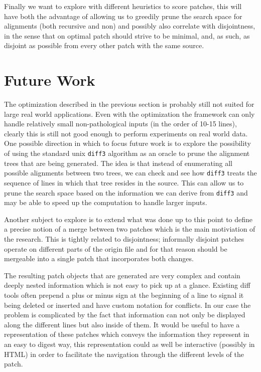 \documentclass[11pt]{article}
\begin{document}
Finally we want to explore with different heuristics to score patches, this will 
have both the advantage of allowing us to greedily prune the search space for 
alignments (both recursive and non) and possibly also correlate with 
disjointness, in the sense that on optimal patch should strive to be minimal, 
and, as such, as disjoint as possible from every other patch with the same source.

\section{Future Work}\label{future work}
The optimization described in the previous section is probably still not suited 
for large real world applications. Even with the optimization the framework can only handle relatively small 
non-pathological inputs (in the order of 10-15 lines), clearly this is still not good enough to perform experiments
on real world data. One possible direction in which to focus future work is to explore the 
possibility of using the standard unix \texttt{diff3} algorithm as an oracle to prune the 
alignment trees that are being generated. 
The idea is that instead of enumerating all possible alignments between two 
trees, we can check and see how \texttt{diff3} treats the sequence of lines in which that 
tree resides in the source. This can allow us to prune the search space based on 
the information we can derive from \texttt{diff3} and may be able to speed up 
the computation to handle larger inputs.

Another subject to explore is to extend what was done up to this point to define 
a precise notion of a merge between two patches which is the main motiviation of the 
research. This is tightly related to disjointness; informally disjoint 
patches operate on different parts of the origin file and for that reason should 
be mergeable into a single patch that incorporates both changes. 

The resulting patch objects that are generated are very complex and contain deeply nested information which is 
not easy to pick up at a glance. 
Existing diff tools often prepend a  plus or minus sign at the beginning of a line to signal it being deleted or 
inserted and have custom notation for conflicts. In our case the problem is 
complicated by the fact that information can not only be displayed along the 
different lines but also inside of them. 
It would be useful to have a representation of these patches which conveys the information 
they represent in an easy to digest way, this representation could as well be 
interactive (possibly in HTML) in order to facilitate the navigation through the 
different levels of the patch.
\end{document}
